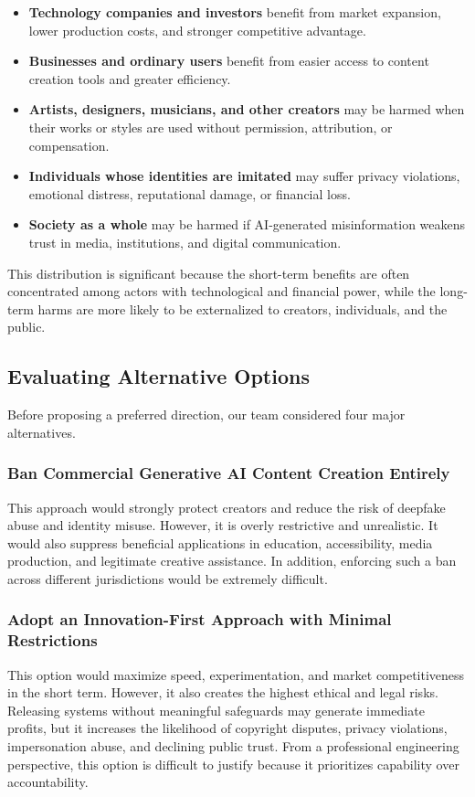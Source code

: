 \begin{itemize}
  \item \textbf{Technology companies and investors} benefit from market expansion, lower production costs, and stronger competitive advantage.
  \item \textbf{Businesses and ordinary users} benefit from easier access to content creation tools and greater efficiency.
  \item \textbf{Artists, designers, musicians, and other creators} may be harmed when their works or styles are used without permission, attribution, or compensation.
  \item \textbf{Individuals whose identities are imitated} may suffer privacy violations, emotional distress, reputational damage, or financial loss.
  \item \textbf{Society as a whole} may be harmed if AI-generated misinformation weakens trust in media, institutions, and digital communication.
\end{itemize}

This distribution is significant because the short-term benefits are often concentrated among actors with technological and financial power, while the long-term harms are more likely to be externalized to creators, individuals, and the public.

\subsection{Evaluating Alternative Options}\label{sec:alternatives}
Before proposing a preferred direction, our team considered four major alternatives.

\subsubsection{Ban Commercial Generative AI Content Creation Entirely}\label{sec:option-ban}
This approach would strongly protect creators and reduce the risk of deepfake abuse and identity misuse. However, it is overly restrictive and unrealistic. It would also suppress beneficial applications in education, accessibility, media production, and legitimate creative assistance. In addition, enforcing such a ban across different jurisdictions would be extremely difficult.

\subsubsection{Adopt an Innovation-First Approach with Minimal Restrictions}\label{sec:option-innovation-first}
This option would maximize speed, experimentation, and market competitiveness in the short term. However, it also creates the highest ethical and legal risks. Releasing systems without meaningful safeguards may generate immediate profits, but it increases the likelihood of copyright disputes, privacy violations, impersonation abuse, and declining public trust. From a professional engineering perspective, this option is difficult to justify because it prioritizes capability over accountability.

